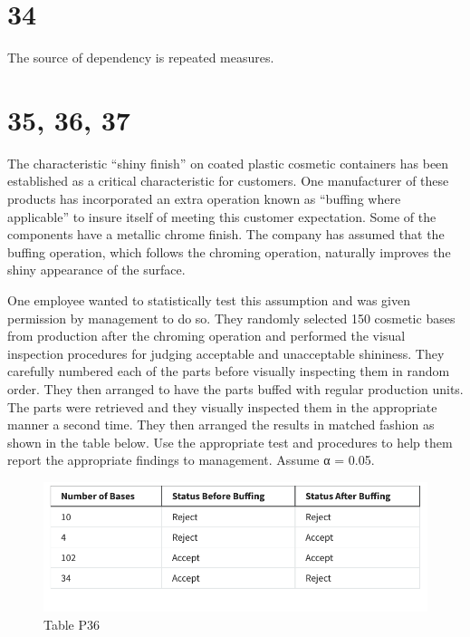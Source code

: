 \documentclass[
]{article}
\begin{document}
\hypertarget{section}{%
\section{34}\label{section}}

The source of dependency is repeated measures.

\hypertarget{section-1}{%
\section{35, 36, 37}\label{section-1}}

The characteristic ``shiny finish'' on coated plastic cosmetic
containers has been established as a critical characteristic for
customers. One manufacturer of these products has incorporated an extra
operation known as ``buffing where applicable'' to insure itself of
meeting this customer expectation. Some of the components have a
metallic chrome finish. The company has assumed that the buffing
operation, which follows the chroming operation, naturally improves the
shiny appearance of the surface.

One employee wanted to statistically test this assumption and was given
permission by management to do so. They randomly selected 150 cosmetic
bases from production after the chroming operation and performed the
visual inspection procedures for judging acceptable and unacceptable
shininess. They carefully numbered each of the parts before visually
inspecting them in random order. They then arranged to have the parts
buffed with regular production units. The parts were retrieved and they
visually inspected them in the appropriate manner a second time. They
then arranged the results in matched fashion as shown in the table
below. Use the appropriate test and procedures to help them report the
appropriate findings to management. Assume α = 0.05.

\begin{figure}
\centering
\includegraphics{quiz_36.png}
\caption{Table P36}
\end{figure}
\end{document}
